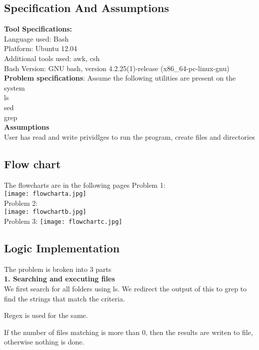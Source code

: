 \documentclass[paper=a4, fontsize=11pt]{scrartcl} %
\numberwithin{equation}{section} %
\numberwithin{figure}{section} %
\numberwithin{table}{section} %
\begin{document}
\newpage
\subsection{Specification And Assumptions}
{\textbf {Tool Specifications:}}\\
Language used: Bash\\
Platform: Ubuntu 12.04\\
Additional tools used: awk, csh\\
Bash Version: GNU bash, version 4.2.25(1)-release (x86\_64-pc-linux-gnu)\\

\textbf{Problem specifications}:
Assume the following utilities are present on the system\\
ls\\
sed\\
grep\\

{\textbf{Assumptions}}\\
User has read and write prividlges to run the program, create files and directories

\newpage
\subsection{Flow chart}
The flowcharts are in the following pages
Problem 1:\\
 {\center\texttt{[image: flowcharta.jpg]}}\\
\newpage
Problem 2:\\
 {\center\texttt{[image: flowchartb.jpg]}}\\
Problem 3:
 {\center\texttt{[image: flowchartc.jpg]}}\\
\newpage


\subsection{Logic Implementation}
The problem is broken into 3 parts\\

\textbf{1. Searching and executing files}\\
We first search for all folders using ls. We redirect the output of this to grep to find the strings that match the criteria.

Regex is used for the same.

If the number of files matching is more than 0, then the results are writen to file, otherwise nothing is done.
\end{document}
